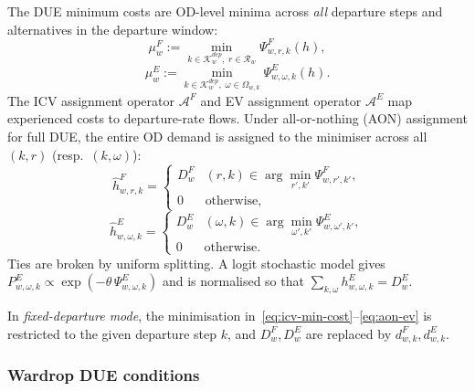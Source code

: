 The DUE minimum costs are OD-level minima across \emph{all} departure
steps and alternatives in the departure window:
\begin{equation}
  \mu^F_w := \min_{k \in \mathcal{K}^{dep}_w,\; r \in \mathcal{R}_w}
    \Psi^F_{w,r,k}(h),
  \label{eq:icv-min-cost}
\end{equation}
\begin{equation}
  \mu^E_w := \min_{k \in \mathcal{K}^{dep}_w,\; \omega \in \Omega_{w,k}}
    \Psi^E_{w,\omega,k}(h).
  \label{eq:ev-min-cost}
\end{equation}
The ICV assignment operator $\mathcal{A}^F$ and EV assignment operator
$\mathcal{A}^E$ map experienced costs to departure-rate flows.
Under all-or-nothing (AON) assignment for full DUE,
the entire OD demand is assigned to the minimiser across all $(k, r)$
(resp.\ $(k, \omega)$):
\begin{equation}
  \hat{h}^F_{w,r,k} =
  \begin{cases}
    D^F_w & (r,k) \in \arg\min_{r',k'} \Psi^F_{w,r',k'}, \\
    0     & \text{otherwise},
  \end{cases}
  \label{eq:aon-icv}
\end{equation}
\begin{equation}
  \hat{h}^E_{w,\omega,k} =
  \begin{cases}
    D^E_w & (\omega,k) \in \arg\min_{\omega',k'} \Psi^E_{w,\omega',k'}, \\
    0     & \text{otherwise}.
  \end{cases}
  \label{eq:aon-ev}
\end{equation}
Ties are broken by uniform splitting.  A logit stochastic model gives
$P^E_{w,\omega,k} \propto \exp(-\theta\,\Psi^E_{w,\omega,k})$ and is
normalised so that $\sum_{k,\omega} h^E_{w,\omega,k} = D^E_w$.

In \emph{fixed-departure mode}, the minimisation in~\eqref{eq:icv-min-cost}--\eqref{eq:aon-ev} is restricted to the given
departure step $k$, and $D^F_w, D^E_w$ are replaced by $d^F_{w,k}, d^E_{w,k}$.

\subsubsection{Wardrop DUE conditions}

